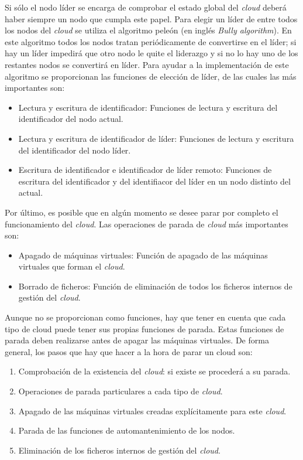 Si sólo el nodo líder se encarga de comprobar el estado global del \emph{cloud} deberá haber siempre un nodo que cumpla este papel. Para elegir un líder de entre todos los nodos del \emph{cloud} se utiliza el algoritmo peleón (en inglés \emph{Bully algorithm}). En este algoritmo todos los nodos tratan periódicamente de convertirse en el líder; si hay un líder impedirá que otro nodo le quite el liderazgo y si no lo hay uno de los restantes nodos se convertirá en líder. Para ayudar a la implementación de este algoritmo se proporcionan las funciones de elección de líder, de las cuales las más importantes son:
\begin{itemize}
\item Lectura y escritura de identificador: Funciones de lectura y escritura del identificador del nodo actual.
\item Lectura y escritura de identificador de líder: Funciones de lectura y escritura del identificador del nodo líder.
\item Escritura de identificador e identificador de líder remoto: Funciones de escritura del identificador y del identifiacor del líder en un nodo distinto del actual.
\end{itemize}

Por último, es posible que en algún momento se desee parar por completo el funcionamiento del \emph{cloud}. Las operaciones de parada de \emph{cloud} más importantes son:
\begin{itemize}
\item Apagado de máquinas virtuales: Función de apagado de las máquinas virtuales que forman el \emph{cloud}.
\item Borrado de ficheros: Función de eliminación de todos los ficheros internos de gestión del \emph{cloud}.
\end{itemize}

Aunque no se proporcionan como funciones, hay que tener en cuenta que cada tipo de cloud puede tener sus propias funciones de parada. Estas funciones de parada deben realizarse antes de apagar las máquinas virtuales. De forma general, los pasos que hay que hacer a la hora de parar un cloud son:
\begin{enumerate}
\item Comprobación de la existencia del \emph{cloud}: si existe se procederá a su parada.
\item Operaciones de parada particulares a cada tipo de \emph{cloud}.
\item Apagado de las máquinas virtuales creadas explícitamente para este \emph{cloud}.
\item Parada de las funciones de automantenimiento de los nodos.
\item Eliminación de los ficheros internos de gestión del \emph{cloud}.
\end{enumerate}


